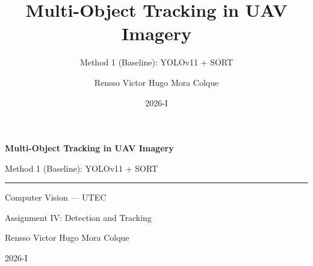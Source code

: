 \documentclass[aspectratio=169]{beamer}
\title{Multi-Object Tracking in UAV Imagery}
\subtitle{Method 1 (Baseline): YOLOv11 + SORT}
\author{Rensso Victor Hugo Mora Colque}
\institute{Computer Vision --- UTEC}
\date{2026-I}
\begin{document}

{
\begin{frame}[plain]
  \vspace{1.2cm}
  \centering
  {\color{utecblue}\Large\bfseries Multi-Object Tracking in UAV Imagery\par}
  \vspace{0.4em}
  {\color{uteccyan}\normalsize Method 1 (Baseline): YOLOv11 + SORT\par}
  \vspace{1.2em}
  \color{utecblue!50}\rule{0.5\textwidth}{0.4pt}\par
  \vspace{0.8em}
  {\color{utecblue!80}\small Computer Vision --- UTEC\par}
  {\color{utecblue!80}\small Assignment IV: Detection and Tracking\par}
  \vspace{0.4em}
  {\color{utecblue!70}\small Rensso Victor Hugo Mora Colque\par}
  {\color{utecblue!60}\small 2026-I\par}
\end{frame}
}
\end{document}
